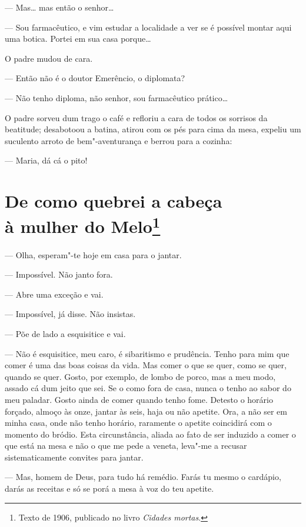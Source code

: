 --- Mas\ldots{} mas então o senhor\ldots{}

--- Sou farmacêutico, e vim estudar a localidade a ver se é possível
montar aqui uma botica. Portei em sua casa porque\ldots{}

O padre mudou de cara.

--- Então não é o doutor Emerêncio, o diplomata?

--- Não tenho diploma, não senhor, sou farmacêutico prático\ldots{}

O padre sorveu dum trago o café e refloriu a cara de todos os sorrisos
da beatitude; desabotoou a batina, atirou com os pés para cima da mesa,
expeliu um suculento arroto de bem"-aventurança e berrou para a cozinha:

--- Maria, dá cá o pito!

\chapter[De como quebrei a cabeça à mulher do Melo]{De como quebrei a cabeça\\ à mulher do Melo\footnote[*]{Texto de 1906, publicado no livro \emph{Cidades mortas}.}}

--- Olha, esperam"-te hoje em casa para o jantar.

--- Impossível. Não janto fora.

--- Abre uma exceção e vai.

--- Impossível, já disse. Não insistas.

--- Põe de lado a esquisitice e vai.

--- Não é esquisitice, meu caro, é sibaritismo e prudência. Tenho para
mim que comer é uma das boas coisas da vida. Mas comer o que se quer,
como se quer, quando se quer. Gosto, por exemplo, de lombo de porco, mas
a meu modo, assado cá dum jeito que sei. Se o como fora de casa, nunca o
tenho ao sabor do meu paladar. Gosto ainda de comer quando tenho fome.
Detesto o horário forçado, almoço às onze, jantar às seis, haja ou não
apetite. Ora, a não ser em minha casa, onde não tenho horário, raramente
o apetite coincidirá com o momento do bródio. Esta circunstância, aliada
ao fato de ser induzido a comer o que está na mesa e não o que me pede a
veneta, leva"-me a recusar
sistematicamente convites para jantar.

--- Mas, homem de Deus, para tudo há remédio. Farás tu mesmo o cardápio,
darás as receitas e só se porá a mesa à voz do teu apetite.

